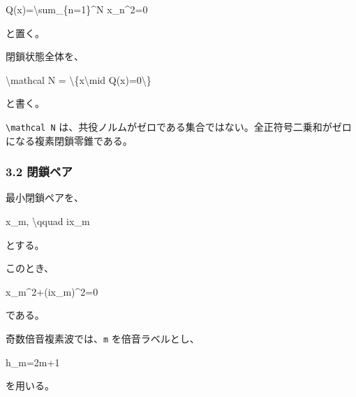\documentclass[
  a4paper,
]{article}
\newenvironment{Shaded}{}{}
\newcommand{\NormalTok}[1]{#1}
\begin{document}
\begin{Shaded}
\begin{Highlighting}[]
\NormalTok{Q(x)=\textbackslash{}sum\_\{n=1\}\^{}N x\_n\^{}2=0}
\end{Highlighting}
\end{Shaded}

と置く。

閉鎖状態全体を、

\begin{Shaded}
\begin{Highlighting}[]
\NormalTok{\textbackslash{}mathcal N}
\NormalTok{=}
\NormalTok{\textbackslash{}\{x\textbackslash{}mid Q(x)=0\textbackslash{}\}}
\end{Highlighting}
\end{Shaded}

と書く。

\texttt{\textbackslash{}mathcal\ N}
は、共役ノルムがゼロである集合ではない。全正符号二乗和がゼロになる複素閉鎖零錐である。

\subsubsection{3.2 閉鎖ペア}\label{ux9589ux9396ux30daux30a2}

最小閉鎖ペアを、

\begin{Shaded}
\begin{Highlighting}[]
\NormalTok{x\_m,}
\NormalTok{\textbackslash{}qquad}
\NormalTok{ix\_m}
\end{Highlighting}
\end{Shaded}

とする。

このとき、

\begin{Shaded}
\begin{Highlighting}[]
\NormalTok{x\_m\^{}2+(ix\_m)\^{}2=0}
\end{Highlighting}
\end{Shaded}

である。

奇数倍音複素波では、\texttt{m} を倍音ラベルとし、

\begin{Shaded}
\begin{Highlighting}[]
\NormalTok{h\_m=2m+1}
\end{Highlighting}
\end{Shaded}

を用いる。
\end{document}

